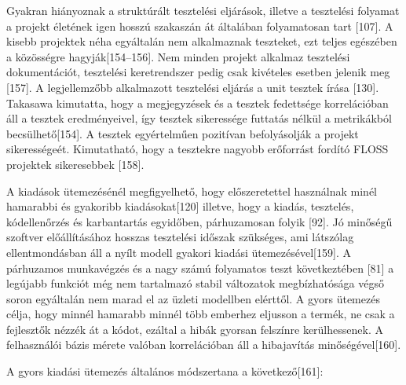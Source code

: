 \documentclass[12pt,magyar,a4paper,oneside]{scrreprt}
\begin{document}
Gyakran hiányoznak a struktúrált tesztelési eljárások, illetve a
tesztelési folyamat a projekt életének igen hosszú szakaszán át
általában folyamatosan tart {[}107{]}. A kisebb projektek néha
egyáltalán nem alkalmaznak teszteket, ezt teljes egészében a közösségre
hagyják{[}154--156{]}. Nem minden projekt alkalmaz tesztelési
dokumentációt, tesztelési keretrendszer pedig csak kivételes esetben
jelenik meg {[}157{]}. A legjellemzőbb alkalmazott tesztelési eljárás a
unit tesztek írása {[}130{]}. Takasawa kimutatta, hogy a megjegyzések és
a tesztek fedettsége korrelációban áll a tesztek eredményeivel, így
tesztek sikeressége futtatás nélkül a metrikákból becsülhető{[}154{]}. A
tesztek egyértelműen pozitívan befolyásolják a projekt sikerességeét.
Kimutatható, hogy a tesztekre nagyobb erőforrást fordító FLOSS projektek
sikeresebbek {[}158{]}.

A kiadások ütemezésénél megfigyelhető, hogy előszeretettel használnak
minél hamarabbi és gyakoribb kiadásokat{[}120{]} illetve, hogy a kiadás,
tesztelés, kódellenőrzés és karbantartás egyidőben, párhuzamosan folyik
{[}92{]}. Jó minőségű szoftver előállításához hosszas tesztelési időszak
szükséges, ami látszólag ellentmondásban áll a nyílt modell gyakori
kiadási ütemezésével{[}159{]}. A párhuzamos munkavégzés és a nagy számú
folyamatos teszt következtében {[}81{]} a legújabb funkciót még nem
tartalmazó stabil változatok megbízhatósága végső soron egyáltalán nem
marad el az üzleti modellben elérttől. A gyors ütemezés célja, hogy
minnél hamarabb minnél több emberhez eljusson a termék, ne csak a
fejlesztők nézzék át a kódot, ezáltal a hibák gyorsan felszínre
kerülhessenek. A felhasználói bázis mérete valóban korrelációban áll a
hibajavítás minőségével{[}160{]}.

A gyors kiadási ütemezés általános módszertana a következő{[}161{]}:
\end{document}
